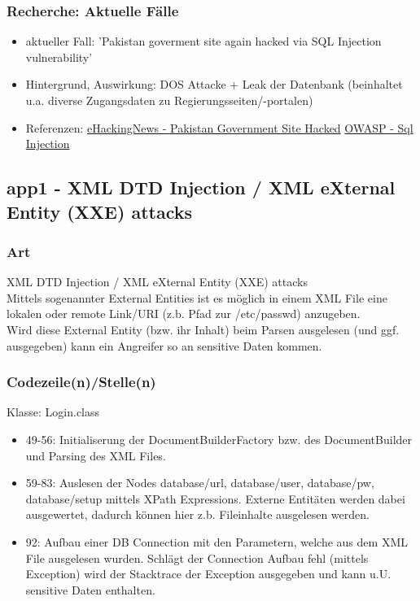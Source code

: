 \documentclass[12pt,a4paper,titlepage,oneside]{scrartcl}
\begin{document}
\subsubsection{Recherche: Aktuelle Fälle}
\noindent	
\begin{itemize}
\item aktueller Fall: 'Pakistan goverment site again hacked via SQL Injection vulnerability'
\item Hintergrund, Auswirkung: DOS Attacke + Leak der Datenbank (beinhaltet u.a. diverse Zugangsdaten zu Regierungsseiten/-portalen)
\item Referenzen: 
\subitem \href{http://www.ehackingnews.com/2013/03/pakistan-goverment-site-again-hacked.htm}{eHackingNews - Pakistan Government Site Hacked}
\subitem \href{https://www.owasp.org/index.php/SQL_Injection}{OWASP - Sql Injection}
\end{itemize}


\subsection{app1 - XML DTD Injection / XML eXternal Entity (XXE) attacks }
\noindent

\subsubsection{Art}
\noindent
XML DTD Injection / XML eXternal Entity (XXE) attacks \\
Mittels sogenannter External Entities ist es möglich in einem XML File eine lokalen oder remote Link/URI (z.b. Pfad zur /etc/passwd) anzugeben. \\
Wird diese External Entity (bzw. ihr Inhalt) beim Parsen ausgelesen (und ggf. ausgegeben) kann ein Angreifer so an sensitive Daten kommen.

\subsubsection{Codezeile(n)/Stelle(n)}
\noindent
Klasse: Login.class
\begin{itemize}  
\item 49-56: Initialiserung der DocumentBuilderFactory bzw. des DocumentBuilder und Parsing des XML Files.
\item 59-83:	Auslesen der Nodes database/url, database/user, database/pw, database/setup mittels XPath Expressions. 
Externe Entitäten werden dabei ausgewertet, dadurch können hier z.b. Fileinhalte ausgelesen werden.
\item 92: Aufbau einer DB Connection mit den Parametern, welche aus dem XML File ausgelesen wurden. 
Schlägt der Connection Aufbau fehl (mittels Exception) wird der Stacktrace der Exception ausgegeben und kann u.U. sensitive Daten enthalten.
\end{itemize}
\end{document}
